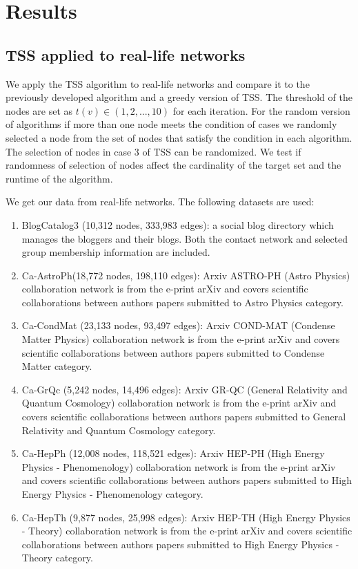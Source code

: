 
\section{Results}
\subsection{TSS applied to real-life networks}

We apply the TSS algorithm to real-life networks and compare it to the previously developed algorithm and a greedy version of TSS. The threshold of the nodes are set as $t(v)\in(1,2,...,10)$ for each iteration. For the random version of algorithms if more than one node meets the condition of cases we randomly selected a node from the set of nodes that satisfy the condition in each algorithm. The selection of nodes in case 3 of TSS can be randomized. We test if randomness of selection of nodes affect the cardinality of the target set and the runtime of the algorithm.

We get our data from real-life networks\cite{datasets1}\cite{datasets2}. The following datasets are used:
\begin{enumerate}
	\item BlogCatalog3 (10,312 nodes, 333,983 edges): a social blog directory which manages the bloggers and their blogs. Both the contact network and selected group membership information are included.
	\item Ca-AstroPh(18,772 nodes, 198,110 edges): Arxiv ASTRO-PH (Astro Physics) collaboration network is from the e-print arXiv and covers scientific collaborations between authors papers submitted to Astro Physics category.
	\item Ca-CondMat (23,133 nodes, 93,497 edges): Arxiv COND-MAT (Condense Matter Physics) collaboration network is from the e-print arXiv and covers scientific collaborations between authors papers submitted to Condense Matter category.
	\item Ca-GrQc (5,242 nodes, 14,496 edges): Arxiv GR-QC (General Relativity and Quantum Cosmology) collaboration network is from the e-print arXiv and covers scientific collaborations between authors papers submitted to General Relativity and Quantum Cosmology category. 
	\item Ca-HepPh (12,008 nodes, 118,521 edges): Arxiv HEP-PH (High Energy Physics - Phenomenology) collaboration network is from the e-print arXiv and covers scientific collaborations between authors papers submitted to High Energy Physics - Phenomenology category.
	\item Ca-HepTh (9,877 nodes, 25,998 edges): Arxiv HEP-TH (High Energy Physics - Theory) collaboration network is from the e-print arXiv and covers scientific collaborations between authors papers submitted to High Energy Physics - Theory category. 
\end{enumerate}

